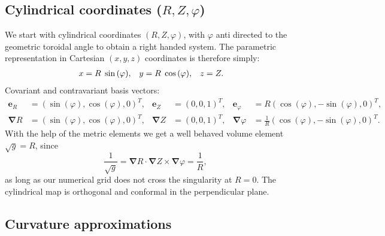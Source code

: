 \documentclass{hitec} %
\renewcommand{\vec}[1]{\boldsymbol{#1}}
\begin{document}
\subsection{Cylindrical coordinates (\(R,Z,\varphi\))}\label{sec:cylmetric}
We start with cylindrical coordinates \( (R,Z,\varphi) \), with \(\varphi\) anti directed to the geometric toroidal angle to
obtain a right handed system. The parametric representation in Cartesian \((x,y,z)\) coordinates is therefore simply:
\begin{align}
 x &= R \hspace{1 mm} \sin{(\varphi)}, &
 y &= R \hspace{1 mm} \cos{(\varphi)}, &
 z &= Z .               
\end{align}
Covariant
and contravariant basis vectors:
\begin{align}
 \vec{e}_R      &= (\sin{(\varphi)} ,   \cos{(\varphi)},0)^T, &
 \vec{e}_Z      &= ( 0 ,0 ,1 )^T, &
 \vec{e}_{\varphi} &= R ( \cos{(\varphi)} , -\sin{(\varphi)} , 0 )^T,
\\
 \vec{\nabla} R &= (\sin{(\varphi)} ,   \cos{(\varphi)},0 )^T , &
  \vec{\nabla}Z &= ( 0 ,0 ,1 )^T,  &
  \vec{\nabla}{\varphi} &= \frac{1}{R} ( \cos{(\varphi)} , -\sin{(\varphi)} , 0 )^T .
\end{align}
With the help of the metric elements we get a well behaved volume element \(\sqrt{g} = R\), since 
\begin{equation}
\frac{1}{ \sqrt{g}} =  \vec{\nabla} R\cdot \vec{\nabla}Z \times\vec{\nabla}{\varphi} =\frac{1}{R},
\end{equation}
as long as our numerical grid does not cross the singularity at \(R=0\). The cylindrical map is orthogonal and conformal in the perpendicular plane. 
\subsection{Curvature approximations}
\end{document}
